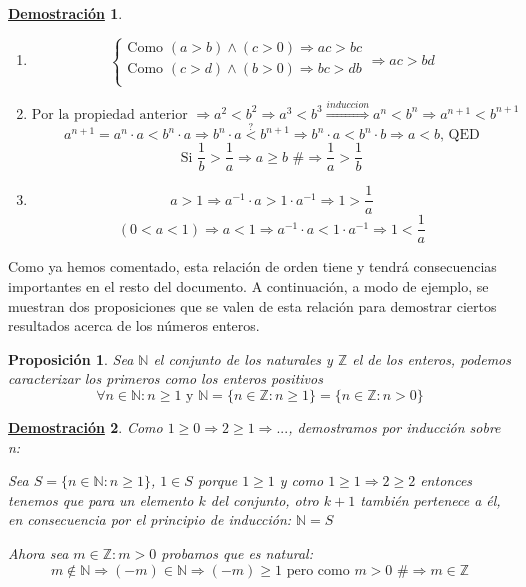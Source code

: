 \documentclass[10pt,a4paper,openright]{book}
\theoremstyle{break}
\newtheorem{prop}{Proposición}[chapter]
\newtheorem*{demo}{\underline{Demostración}}
\begin{document}
\begin{demo}
\begin{enumerate}
$$\begin{cases}
a>0 \Rightarrow b<0 & \mbox{Si fuese } b>0\Rightarrow ab>0 \mbox{ \#}\\
a<0 \Rightarrow b>0 & \mbox{Si fuese } b<0\Rightarrow ab>0 \mbox{ \#}
\end{cases}
$$
\item $$
\begin{cases}
\mbox{Como } (a>b) \wedge (c>0)\Rightarrow ac>bc   \\
\mbox{Como } (c>d) \wedge (b>0)\Rightarrow bc>db   \\
\end{cases}
\Rightarrow ac>bd
$$
\item $$\mbox{Por la propiedad anterior }\Rightarrow a^2<b^2\Rightarrow a^3<b^3\stackrel{induccion}{\Rightarrow} a^n<b^n\Rightarrow a^{n+1}<b^{n+1}$$
$$a^{n+1}=a^n\cdot a<b^n\cdot a\Rightarrow b^n\cdot a\stackrel{?}{<}b^{n+1}\Rightarrow b^n\cdot a< b^n\cdot b \Rightarrow a<b \mbox{, QED}$$
$$\mbox{Si } \frac{1}{b}>\frac{1}{a}\Rightarrow a\geq b \mbox{ \#}\Rightarrow \frac{1}{a}>\frac{1}{b}$$
\item $$a>1\Rightarrow a^{-1}\cdot a>1\cdot a^{-1}\Rightarrow 1>\frac{1}{a}$$
$$(0<a<1)\Rightarrow a<1\Rightarrow a^{-1}\cdot a<1\cdot a^{-1}\Rightarrow 1<\frac{1}{a}$$
\end{enumerate}
\end{demo}

Como ya hemos comentado, esta relación de orden tiene y tendrá consecuencias importantes en el resto del documento. A continuación, a modo de ejemplo, se muestran dos proposiciones que se valen de esta relación para demostrar ciertos resultados acerca de los números enteros.

\begin{prop}
Sea $\mathbb N$ el conjunto de los naturales y $\mathbb Z$ el de los enteros, podemos caracterizar los primeros como los enteros positivos
\[
\forall n \in \mathbb N: n\geq 1 \mbox{ y } \mathbb N =\{n\in \mathbb Z: n\geq 1\}=\{n\in \mathbb Z : n>0\}
\]
\end{prop}
\begin{demo}
Como $1\geq 0\Rightarrow 2\geq 1 \Rightarrow ...$, demostramos por inducción sobre n:\par
Sea $S=\{n\in \mathbb N: n\geq 1\}$, $1\in S$ porque $1\geq 1$ y como $1\geq 1\Rightarrow 2\geq 2$ entonces tenemos que para un elemento $k$ del conjunto, otro $k+1$ también pertenece a él, en consecuencia por el principio de inducción: $\mathbb N=S$\par
Ahora sea $m\in \mathbb Z: m>0$ probamos  que es natural:
$$m\notin \mathbb N \Rightarrow (-m)\in \mathbb N \Rightarrow (-m)\geq  1\mbox{ pero como }m>0 \mbox{ \#}\Rightarrow m\in \mathbb Z$$
\end{demo}
\end{document}
